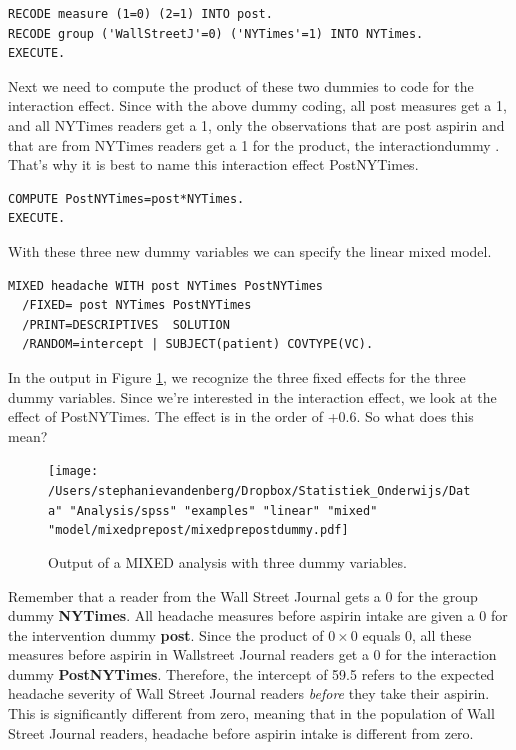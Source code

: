 \documentclass[]{book}\usepackage[]{graphicx}\usepackage[]{color}
\begin{document}
\begin{verbatim}
RECODE measure (1=0) (2=1) INTO post.
RECODE group ('WallStreetJ'=0) ('NYTimes'=1) INTO NYTimes.
EXECUTE.
\end{verbatim}

Next we need to compute the product of these two dummies to code for the interaction effect. Since with the above dummy coding, all post measures get a 1, and all NYTimes readers get a 1, only the observations that are post aspirin and that are from NYTimes readers get a 1 for the product, the interactiondummy . That's why it is best to name this interaction effect PostNYTimes. 

\begin{verbatim}
COMPUTE PostNYTimes=post*NYTimes.
EXECUTE.
\end{verbatim}

With these three new dummy variables we can specify the linear mixed model.

\begin{verbatim}
MIXED headache WITH post NYTimes PostNYTimes
  /FIXED= post NYTimes PostNYTimes
  /PRINT=DESCRIPTIVES  SOLUTION
  /RANDOM=intercept | SUBJECT(patient) COVTYPE(VC).
\end{verbatim}


In the output in Figure \ref{fig:mixedprepostdummy}, we recognize the three fixed effects for the three dummy variables. Since we're interested in the interaction effect, we look at the effect of PostNYTimes. The effect is in the order of +0.6. So what does this mean? 

\begin{figure}[h]
    \begin{center}
       \texttt{[image: /Users/stephanievandenberg/Dropbox/Statistiek\_Onderwijs/Data" "Analysis/spss" "examples" "linear" "mixed" "model/mixedprepost/mixedprepostdummy.pdf]}
    \end{center}
    \label{fig:mixedprepostdummy}
    \caption{Output of a MIXED analysis with three dummy variables.}
\end{figure}



Remember that a reader from the Wall Street Journal gets a 0 for the group dummy \textbf{NYTimes}. All headache measures before aspirin intake are given a 0 for the intervention dummy \textbf{post}. 
Since the product of $ 0\times 0$ equals 0, all these measures before aspirin in Wallstreet Journal readers get a 0 for the interaction dummy \textbf{PostNYTimes}.
Therefore, the intercept of 59.5 refers to the expected headache severity of Wall Street Journal readers \textit{before} they take their aspirin. This is significantly different from zero, meaning that in the population of Wall Street Journal readers, headache before aspirin intake is different from zero.
\end{document}
